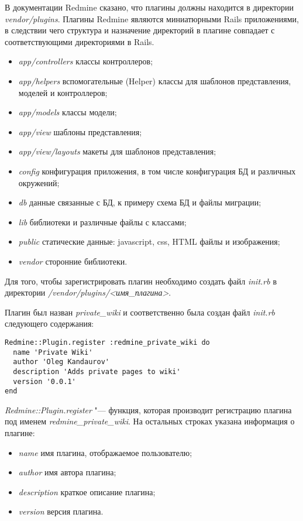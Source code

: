 В документации Redmine сказано, что плагины должны находится в директории
\textit{vendor/plugins}. Плагины Redmine являются миниатюрными Rails
приложениями, в следствии чего структура и назначение директорий в плагине
совпадает с соответствующими директориями в Rails.
\begin{itemize}
\item \textit{app/controllers} классы контроллеров;
\item \textit{app/helpers} вспомогательные (Helper) классы для шаблонов
представления, моделей и контроллеров;
\item \textit{app/models} классы модели;
\item \textit{app/view} шаблоны представления;
\item \textit{app/view/layouts} макеты для шаблонов представления;
\item \textit{config} конфигурация приложения, в том числе конфигурация БД и
различных окружений;
\item \textit{db} данные связанные с БД, к примеру схема БД и файлы миграции;
\item \textit{lib} библиотеки и различные файлы с классами;
\item \textit{public} статические данные: javascript, css, HTML файлы и
изображения;
\item \textit{vendor} сторонние библиотеки.
\end{itemize}
Для того, чтобы зарегистрировать плагин необходимо создать файл
\textit{init.rb} в директории \textit{/vendor/plugins/<имя\_плагина>}.

Плагин был назван \textit{private\_wiki} и соответственно была создан файл
\textit{init.rb} следующего содержания:
\small{\begin{lstlisting}
Redmine::Plugin.register :redmine_private_wiki do
  name 'Private Wiki'
  author 'Oleg Kandaurov'
  description 'Adds private pages to wiki'
  version '0.0.1'
end
\end{lstlisting}}
\textit{Redmine::Plugin.register} "--- функция, которая производит регистрацию
плагина под именем \textit{redmine\_private\_wiki}. На остальных строках
указана информация о плагине:
\begin{itemize} 
  \item \textit{name} имя плагина, отображаемое пользователю;
  \item \textit{author} имя автора плагина;
  \item \textit{description} краткое описание плагина;
  \item \textit{version} версия плагина.
\end{itemize}

